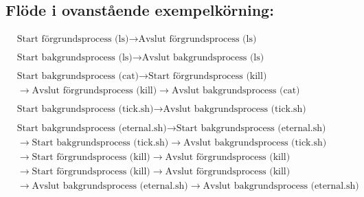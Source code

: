 \documentclass[paper=a4, fontsize=11pt]{scrartcl} %
\numberwithin{equation}{section} %
\numberwithin{figure}{section} %
\numberwithin{table}{section} %
\begin{document}
\subsection*{Flöde i ovanstående exempelkörning:}
\begin{align*}
&\text{Start förgrundsprocess (ls)} \rightarrow \text{Avslut förgrundsprocess (ls)} 
\\\\&\text{Start bakgrundsprocess (ls)} \rightarrow \text{Avslut bakgrundsprocess (ls)} 
\\\\&\text{Start bakgrundsprocess (cat)} \rightarrow \text{Start förgrundsprocess (kill)} 
\\& \rightarrow \text{Avslut förgrundsprocess (kill)} \rightarrow \text{Avslut bakgrundsprocess (cat)}
\\\\&\text{Start bakgrundsprocess (tick.sh)} \rightarrow \text{Avslut bakgrundsprocess (tick.sh)}  
\\\\&\text{Start bakgrundsprocess (eternal.sh)} \rightarrow \text{Start bakgrundsprocess (eternal.sh)} 
\\&\rightarrow \text{Start bakgrundsprocess (tick.sh)} \rightarrow \text{Avslut bakgrundsprocess (tick.sh)} 
\\&\rightarrow\text{Start förgrundsprocess (kill)} \rightarrow \text{Avslut förgrundsprocess (kill)} 
\\&\rightarrow\text{Start förgrundsprocess (kill)} \rightarrow \text{Avslut förgrundsprocess (kill)} 
\\&\rightarrow\text{Avslut bakgrundsprocess (eternal.sh)} \rightarrow \text{Avslut bakgrundsprocess (eternal.sh)} 
\end{align*}

\newpage
\end{document}
